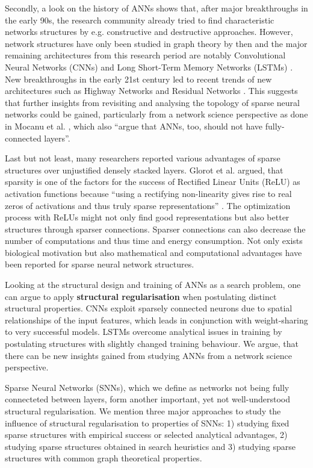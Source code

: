 \documentclass[runningheads]{llncs}
\begin{document}
Secondly, a look on the history of ANNs shows that, after major breakthroughs in the early 90s, the research community already tried to find characteristic networks structures by e.g. constructive and destructive approaches. However, network structures have only been studied in graph theory by then and the major remaining architectures from this research period are notably Convolutional Neural Networks (CNNs) \cite{lecun1990handwritten} and Long Short-Term Memory Networks (LSTMs) \cite{hochreiter1997long}.
New breakthroughs in the early 21st century led to recent trends of new architectures such as Highway Networks \cite{srivastava2015highway} and Residual Networks \cite{he2016deep}.
This suggests that further insights from revisiting and analysing the topology of sparse neural networks could be gained, particularly from a network science perspective as done in Mocanu et al. \cite{mocanu2017evolutionary}, which also ``argue that ANNs, too, should not have fully-connected layers''.

Last but not least, many researchers reported various advantages of sparse structures over unjustified densely stacked layers.
Glorot et al. argued, that sparsity is one of the factors for the success of Rectified Linear Units (ReLU) as activation functions because ``using a rectifying non-linearity gives rise to real zeros of activations and thus truly sparse representations'' \cite{glorot2011deep}.
The optimization process with ReLUs might not only find good representations but also better structures through sparser connections.
Sparser connections can also decrease the number of computations and thus time and energy consumption.
Not only exists biological motivation but also mathematical and computational advantages have been reported for sparse neural network structures.

Looking at the structural design and training of ANNs as a search problem, one can argue to apply \textbf{structural regularisation} when postulating distinct structural properties.
CNNs exploit sparsely connected neurons due to spatial relationships of the input features, which leads in conjunction with weight-sharing to very successful models.
LSTMs overcome analytical issues in training by postulating structures with slightly changed training behaviour.
We argue, that there can be new insights gained from studying ANNs from a network science perspective.

Sparse Neural Networks (SNNs), which we define as networks not being fully connecteted between layers, form another important, yet not well-understood structural regularisation.
We mention three major approaches to study the influence of structural regularisation to properties of SNNs: 1) studying fixed sparse structures with empirical success or selected analytical advantages, 2) studying sparse structures obtained in search heuristics and 3) studying sparse structures with common graph theoretical properties.
\end{document}
